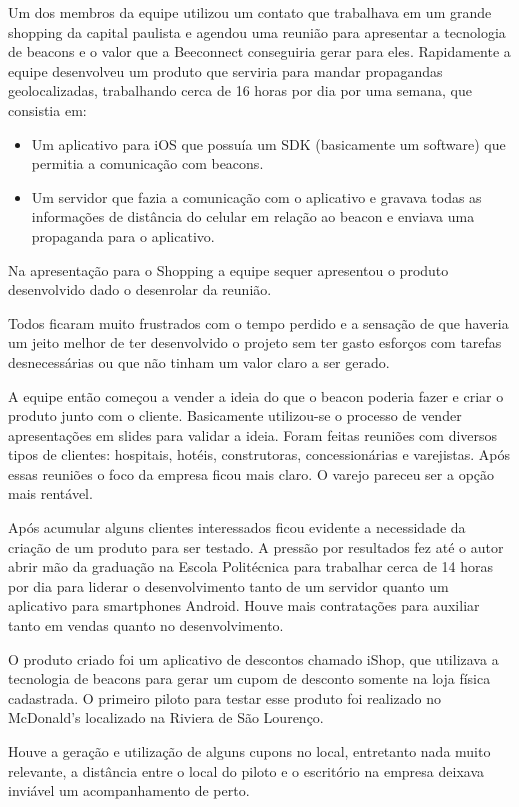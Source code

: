 Um dos membros da equipe utilizou um contato que trabalhava em um grande shopping da capital paulista e agendou uma reunião para apresentar a tecnologia de beacons e o valor que a Beeconnect conseguiria gerar para eles. Rapidamente a equipe desenvolveu  um produto que serviria para mandar propagandas geolocalizadas, trabalhando cerca de 16 horas por dia por uma semana, que consistia em:
\begin{itemize}
\item Um aplicativo para iOS que possuía um SDK (basicamente um software) que permitia a comunicação com beacons.
\item Um servidor que fazia a comunicação com o aplicativo e gravava todas as informações de distância do celular em relação ao beacon e enviava uma propaganda para o aplicativo.
\end{itemize}

Na apresentação para o Shopping a equipe sequer apresentou o produto desenvolvido dado o desenrolar da reunião.

Todos ficaram muito frustrados com o tempo perdido e a sensação de que haveria um jeito melhor de ter desenvolvido o projeto sem ter gasto esforços com tarefas desnecessárias ou que não tinham um valor claro a ser gerado.

A equipe então começou a vender a ideia do que o beacon poderia fazer e criar o produto junto com o cliente. Basicamente utilizou-se o processo de vender apresentações em slides para validar a ideia. Foram feitas reuniões com diversos tipos de clientes: hospitais, hotéis, construtoras, concessionárias e varejistas. Após essas reuniões o foco da empresa ficou mais claro. O varejo pareceu ser a opção mais rentável.

Após acumular alguns clientes interessados ficou evidente a necessidade da criação de um produto para ser testado. A pressão por resultados fez até o autor abrir mão da graduação na Escola Politécnica para trabalhar cerca de 14 horas por dia para liderar o desenvolvimento tanto de um servidor quanto um aplicativo para smartphones Android. Houve mais contratações para auxiliar tanto em vendas quanto no desenvolvimento.

O produto criado foi um aplicativo de descontos chamado iShop, que utilizava a tecnologia de beacons para gerar um cupom de desconto somente na loja física cadastrada. O primeiro piloto para testar esse produto foi realizado no McDonald's localizado na Riviera de São Lourenço.

Houve a geração e utilização de alguns cupons no local, entretanto nada muito relevante, a distância entre o local do piloto e o escritório na empresa deixava inviável um acompanhamento de perto.

